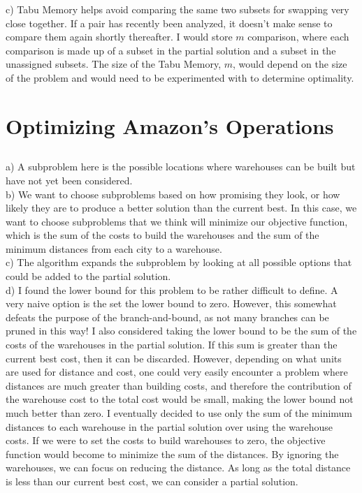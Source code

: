 \documentclass{article}
\begin{document}
c) Tabu Memory helps avoid comparing the same two subsets for swapping very close together. If a pair has recently been analyzed, it doesn't make sense to compare them again shortly thereafter. I would store $m$ comparison, where each comparison is made up of a subset in the partial solution and a subset in the unassigned subsets. The size of the Tabu Memory, $m$, would depend on the size of the problem and would need to be experimented with to determine optimality.

\newpage
\section{Optimizing Amazon's Operations}

\subsection{}

a) A subproblem here is the possible locations where warehouses can be built but have not yet been considered.\\

b) We want to choose subproblems based on how promising they look, or how likely they are to produce a better solution than the current best. In this case, we want to choose subproblems that we think will minimize our objective function, which is the sum of the costs to build the warehouses and the sum of the minimum distances from each city to a warehouse.\\

c) The algorithm expands the subproblem by looking at all possible options that could be added to the partial solution. \\

d) I found the lower bound for this problem to be rather difficult to define. A very naive option is the set the lower bound to zero. However, this somewhat defeats the purpose of the branch-and-bound, as not many branches can be pruned in this way! I also considered taking the lower bound to be the sum of the costs of the warehouses in the partial solution. If this sum is greater than the current best cost, then it can be discarded. However, depending on what units are used for distance and cost, one could very easily encounter a problem where distances are much greater than building costs, and therefore the contribution of the warehouse cost to the total cost would be small, making the lower bound not much better than zero. I eventually decided to use only the sum of the minimum distances to each warehouse in the partial solution over using the warehouse costs. If we were to set the costs to build warehouses to zero, the objective function would become to minimize the sum of the distances. By ignoring the warehouses, we can focus on reducing the distance. As long as the total distance is less than our current best cost, we can consider a partial solution.\\
\end{document}

